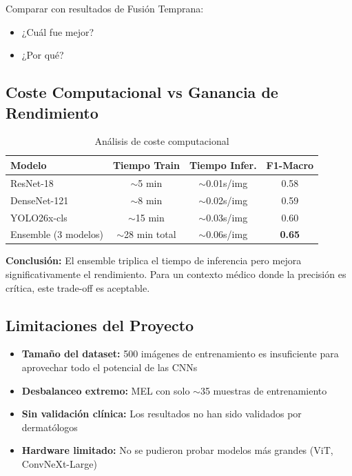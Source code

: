 \documentclass[12pt,a4paper]{article}
\begin{document}
\begin{pendiente}
Comparar con resultados de Fusión Temprana:
\begin{itemize}
    \item ¿Cuál fue mejor?
    \item ¿Por qué?
\end{itemize}
\end{pendiente}

\subsection{Coste Computacional vs Ganancia de Rendimiento}

\begin{table}[H]
\centering
\begin{tabular}{lccc}
\toprule
\textbf{Modelo} & \textbf{Tiempo Train} & \textbf{Tiempo Infer.} & \textbf{F1-Macro} \\
\midrule
ResNet-18 & $\sim$5 min & $\sim$0.01s/img & 0.58 \\
DenseNet-121 & $\sim$8 min & $\sim$0.02s/img & 0.59 \\
YOLO26x-cls & $\sim$15 min & $\sim$0.03s/img & 0.60 \\
Ensemble (3 modelos) & $\sim$28 min total & $\sim$0.06s/img & \textbf{0.65} \\
\bottomrule
\end{tabular}
\caption{Análisis de coste computacional}
\label{tab:coste}
\end{table}

\textbf{Conclusión:} El ensemble triplica el tiempo de inferencia pero mejora significativamente el rendimiento. Para un contexto médico donde la precisión es crítica, este trade-off es aceptable.

\subsection{Limitaciones del Proyecto}

\begin{itemize}
    \item \textbf{Tamaño del dataset:} 500 imágenes de entrenamiento es insuficiente para aprovechar todo el potencial de las CNNs
    \item \textbf{Desbalanceo extremo:} MEL con solo $\sim$35 muestras de entrenamiento
    \item \textbf{Sin validación clínica:} Los resultados no han sido validados por dermatólogos
    \item \textbf{Hardware limitado:} No se pudieron probar modelos más grandes (ViT, ConvNeXt-Large)
\end{itemize}
\end{document}

